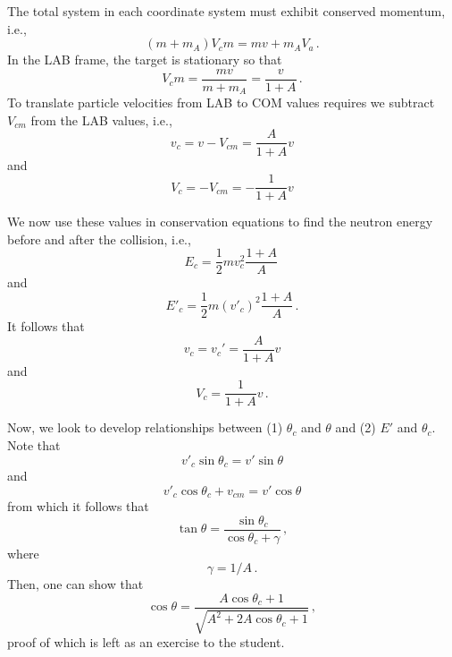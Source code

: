 The total system in each coordinate system must exhibit conserved 
momentum, i.e.,
\begin{equation}
   (m + m_A) V_cm = mv + m_A V_a \, .
\end{equation}
In the LAB frame, the target is stationary so that
\begin{equation}
  V_cm = \frac{mv}{m + m_A} = \frac{v}{1+A} \, .
\end{equation}
To translate particle velocities from LAB to COM values
requires we subtract $V_{cm}$ from the LAB values, i.e.,
\begin{equation}
 v_c = v - V_{cm} = \frac{A}{1+A}v
\end{equation}
and
\begin{equation}
 V_c = -V_{cm} = -\frac{1}{1+A}v
\end{equation}

We now use these values in conservation equations to find 
the neutron energy before and after the collision, i.e.,
\begin{equation}
 E_c = \frac{1}{2} m v_c^2 \frac{1+A}{A} \, 
\end{equation}
and
\begin{equation}
 E'_c = \frac{1}{2} m (v'_c)^2 \frac{1+A}{A} \, .
\end{equation}
It follows that
\begin{equation}
 v_c = v_c' = \frac{A}{1+A} v
\end{equation}
and
\begin{equation}
 V_c = \frac{1}{1+A}v \, .
\end{equation}

Now, we look to develop relationships between (1) $\theta_c$ 
and $\theta$ and (2) $E'$ and $\theta_c$.
Note that
\begin{equation}
 v'_c \sin \theta_c = v' \sin \theta
\label{eq:lab_com_1}
\end{equation}
and 
\begin{equation}
 v'_c \cos \theta_c + v_{cm} = v' \cos \theta
\label{eq:lab_com_2}
\end{equation}
from which it follows that
\begin{equation}
  \tan{\theta} = \frac{\sin \theta_c}{\cos \theta_c + \gamma} \, ,
\end{equation}
where 
\begin{equation}
 \gamma = 1/A \, .
\end{equation}
Then, one can show that 
\begin{equation}
 \cos \theta = \frac{  A \cos \theta_c + 1 } {\sqrt{ A^2 + 2 A \cos \theta_c +1 }} \, ,
\label{eq:theta_thetac}
\end{equation}
proof of which is left as an exercise to the student.


